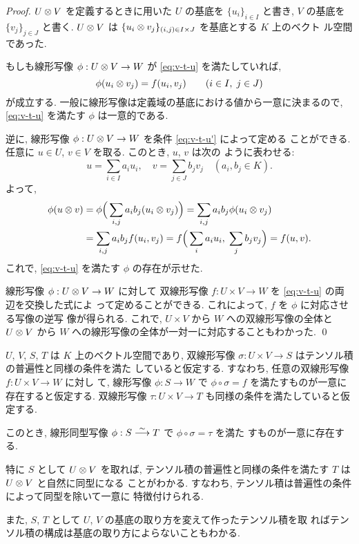 \documentclass[12pt,twoside]{jarticle}
\begin{document}
\begin{proof}
  $U\otimes V$ を定義するときに用いた $U$ の基底を $\{u_i\}_{i\in I}$ と書き,
  $V$ の基底を $\{v_j\}_{j\in J}$ と書く. 
  $U\otimes V$ は $\{u_i\otimes v_j\}_{(i,j)\in I\times J}$ を基底とする $K$ 上のベクト
  ル空間であった.

  もしも線形写像 $\phi: U\otimes V \to W$ が \eqref{eq:v-t-u} を満たしていれば,
  \begin{equation}
    \label{eq:v-t-u'}
    \phi(u_i\otimes v_j) = f(u_i, v_j) \qquad (i\in I,\; j\in J)
  \end{equation}
  が成立する. 一般に線形写像は定義域の基底における値から一意に決まるので, 
  \eqref{eq:v-t-u} を満たす $\phi$ は一意的である.

  逆に, 線形写像 $\phi: U\otimes V \to W$ を条件 \eqref{eq:v-t-u'} によって定める
  ことができる.  任意に $u\in U$, $v\in V$ を取る. このとき, $u$, $v$ は次の
  ように表わせる: 
  \begin{equation*}
    u = \sum_{i\in I} a_i u_i, \quad
    v = \sum_{j\in J} b_j v_j  \quad (a_i,b_j\in K).
  \end{equation*}
  よって,
  \begin{align*}
    \phi(u\otimes v)
    &
    = \phi\Big( \sum_{i,j} a_i b_j (u_i\otimes v_j) \Big) 
    = \sum_{i,j} a_i b_j \phi(u_i\otimes v_j)
    \\ &
    = \sum_{i,j} a_i b_j f(u_i, v_j)
    = f\Big(\sum_i a_i u_i,\; \sum_j b_j v_j\Big)
    = f(u,v).
  \end{align*}
  これで, \eqref{eq:v-t-u} を満たす $\phi$ の存在が示せた.

  線形写像 $\phi: U\otimes V\to W$ に対して
  双線形写像 $f: U\times V\to W$ を \eqref{eq:v-t-u} の両辺を交換した式によ
  って定めることができる. これによって, $f$ を $\phi$ に対応させる写像の逆写
  像が得られる.
  これで, $U\times V$ から $W$ への双線形写像の全体と
  $U\otimes V$ から $W$ への線形写像の全体が一対一に対応することもわかった.
  \qed
\end{proof}

\begin{theorem}[テンソル積の普遍性による特徴付け]
  $U$, $V$, $S$, $T$ は $K$ 上のベクトル空間であり,
  双線形写像 $\sigma: U\times V\to S$ はテンソル積の普遍性と同様の条件を満た
  していると仮定する. すなわち, 任意の双線形写像 $f: U\times V\to W$ に対し
  て, 線形写像 $\phi: S \to W$ で $\phi\circ\sigma = f$ を満たすものが一意に
  存在すると仮定する. 
  双線形写像 $\tau: U\times V\to T$ も同様の条件を満たしていると仮定する.

  このとき, 線形同型写像 $\phi:S\overset\sim\longrightarrow T$ で $\phi\circ\sigma=\tau$ を満た
  すものが一意に存在する. 

  特に $S$ として $U\otimes V$ を取れば,
  テンソル積の普遍性と同様の条件を満たす $T$ は $U\otimes V$ と自然に同型になる
  ことがわかる. すなわち, テンソル積は普遍性の条件によって同型を除いて一意に
  特徴付けられる.

  また, $S$, $T$ として $U$, $V$ の基底の取り方を変えて作ったテンソル積を取
  ればテンソル積の構成は基底の取り方によらないこともわかる.
\end{theorem}
\end{document}
